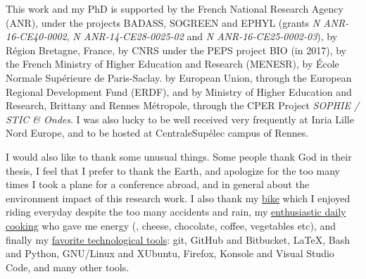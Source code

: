 \begin{acknowledgements}
This work and my PhD is supported by
the French National Research Agency (ANR), under the projects BADASS, SOGREEN and EPHYL (grants \emph{N ANR-16-CE40-0002}, \emph{N ANR-14-CE28-0025-02} and \emph{N ANR-16-CE25-0002-03}),
by R\'egion Bretagne, France,
by CNRS under the PEPS project BIO (in 2017),
by the French Ministry of Higher Education and Research (MENESR),
by \'Ecole Normale Sup\'erieure de Paris-Saclay.
by European Union, through the European Regional Development Fund (ERDF),
and by Ministry of Higher Education and Research, Brittany and Rennes Métropole, through the CPER Project \emph{SOPHIE / STIC \& Ondes}.
I was also lucky to be well received very frequently at Inria Lille Nord Europe, and to be hosted at CentraleSupélec campus of Rennes.


I would also like to thank some unusual things. Some people thank God in their thesis, I feel that I prefer to thank the Earth, and apologize for the too many times I took a plane for a conference abroad, and in general about the environment impact of this research work.
I also thank my \href{https://perso.crans.org/besson/zero-dechet/}{bike} which I enjoyed riding everyday despite the too many accidents and rain, my \href{https://perso.crans.org/besson/cuisine/}{enthusiastic daily cooking} who gave me energy (\eg, cheese, chocolate, coffee, vegetables etc), and finally my \href{https://perso.crans.org/besson/}{favorite technological tools}: git, GitHub and Bitbucket, \LaTeX, Bash and Python, GNU/Linux and XUbuntu, Firefox, Konsole and Visual Studio Code, and many other tools.



\end{acknowledgements}
